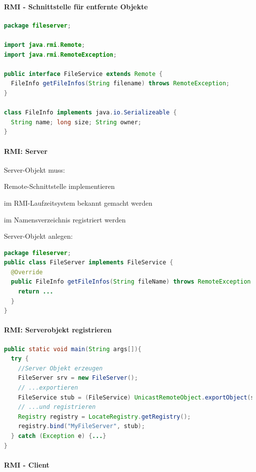 \documentclass[10pt]{article}
\begin{document}
\paragraph{RMI - Schnittstelle für entfernte Objekte}

\begin{lstlisting}[language=java]
package fileserver;

import java.rmi.Remote;
import java.rmi.RemoteException;

public interface FileService extends Remote {
  FileInfo getFileInfos(String filename) throws RemoteException;
}

class FileInfo implements java.io.Serializeable {
  String name; long size; String owner;
}
\end{lstlisting}

\paragraph{RMI: Server}

Server-Objekt muss: 
\begin{itemize*}
  \item Remote-Schnittstelle implementieren
  \item im RMI-Laufzeitsystem bekannt gemacht werden
  \item im Namensverzeichnis registriert werden
\end{itemize*}
Server-Objekt anlegen: 
\begin{lstlisting}[language=java]
package fileserver;
public class FileServer implements FileService {
  @Override
  public FileInfo getFileInfos(String fileName) throws RemoteException {
    return ...
  }
}
\end{lstlisting}

\paragraph{RMI: Serverobjekt registrieren}
\begin{lstlisting}[language=java]
public static void main(String args[]){
  try {
    //Server Objekt erzeugen
    FileServer srv = new FileServer();
    // ...exportieren
    FileService stub = (FileService) UnicastRemoteObject.exportObject(srv, 0);
    // ...und registrieren
    Registry registry = LocateRegistry.getRegistry();
    registry.bind("MyFileServer", stub);
  } catch (Exception e) {...}
}
\end{lstlisting}

\paragraph{RMI - Client}
\end{document}
